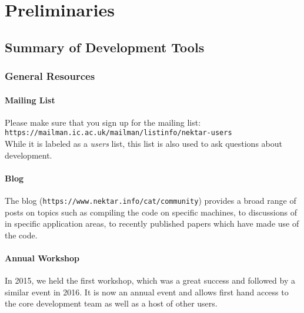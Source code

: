 
\chapter{Preliminaries}



\section{Summary of Development Tools}


\subsection{General Resources}

\subsubsection{Mailing List}

Please make sure that you sign up for the {\nek} mailing list: \\

\texttt{https://mailman.ic.ac.uk/mailman/listinfo/nektar-users} \\

While it is labeled as a \textit{users} list, this list is also used
to ask questions about {\nek} development.

\subsubsection{Blog}

The {\nek} blog (\texttt{https://www.nektar.info/cat/community})
provides a broad range of posts on topics such as compiling the code
on specific machines, to discussions of {\nek} in specific
application areas, to recently published papers which have made use of
the code.

\subsubsection{Annual Workshop}

In 2015, we held the first {\nek} workshop, which was a great
success and followed by a similar event in 2016. It is now an annual
event and allows first hand access to the core {\nek} development
team as well as a host of other {\nek} users.

